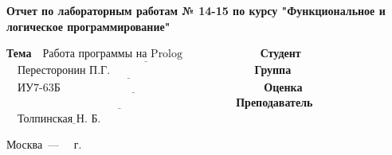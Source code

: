 \begin{titlepage}
    \begin{center}
        \Large\textbf{Отчет по лабораторным работам № 14-15 по курсу "Функциональное и логическое программирование"}
    \end{center}

    \noindent\textbf{Тема} $\underline{\text{~~Работа программы на Prolog~~~~~~~~~~~~~~~~~~~~}}$\newline\newline\newline
    \noindent\textbf{Студент} $\underline{\text{~~~Пересторонин П.Г.~~~~~~~~~~~~~~~~~~~~~~~~~~~~~~~~~~~~~~}}$\newline\newline
    \noindent\textbf{Группа} $\underline{\text{~~~ИУ7-63Б~~~~~~~~~~~~~~~~~~~~~~~~~~~~~~~~~~~~~~~~~~~~~~~~~~~~~~}}$\newline\newline
    \noindent\textbf{Оценка} $\underline{\text{~~~~~~~~~~~~~~~~~~~~~~~~~~~~~~~~~~~~~~~~~~~~~~~~~~~~~~~~~~~~~}}$\newline\newline
    \noindent\textbf{Преподаватель} $\underline{\text{~~~Толпинская Н. Б.~~~~~~~~~~~}}$\newline

    \begin{center}
        \vfill
        Москва~---~\the\year
        ~г.
    \end{center}
    \restoregeometry
\end{titlepage}
